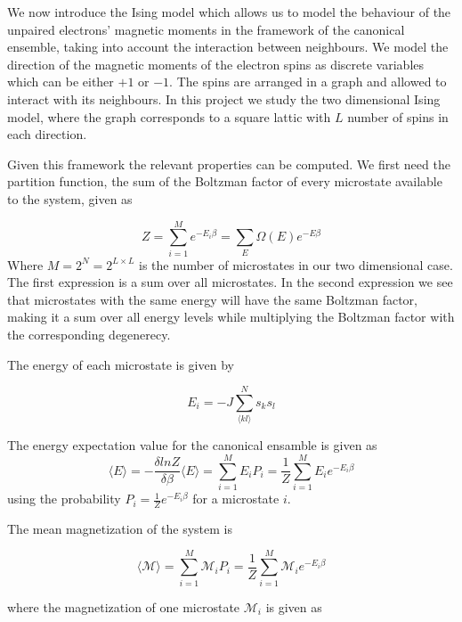 \documentclass[norsk, 10pt, twocolumn, a4paper]{revtex4}
\begin{document}
We now introduce the Ising model which allows us to model the behaviour of the unpaired electrons'
magnetic moments in the framework of the canonical
ensemble, taking into account the interaction between neighbours.
We model the direction of the
magnetic moments of the electron spins as discrete variables which can be either $+1$ or
$-1$. The spins are arranged in a graph and allowed to interact with its neighbours.
In this project we study the two dimensional Ising model, where the graph corresponds to a
square lattic with $L$ number of spins in each direction.

Given this framework the relevant properties can be computed. We first need the partition function, the sum
of the Boltzman factor of every microstate available to the system, given as

\begin{equation}
    \label{eq:Z}
    Z = \sum\limits_{i=1}^M e^{-E_i\beta} = \sum\limits_E \Omega(E) e^{-E\beta}
\end{equation}
Where $M=2^N = 2^{L\times L}$ is the number of microstates in our two dimensional case. The first expression is a
sum over all microstates. In the second expression we see that microstates with the same
energy will have the same Boltzman factor, making it a sum over all energy levels while multiplying
the Boltzman factor with the corresponding degenerecy.

The energy of each microstate is given by

\begin{equation}
    \label{eq:Ei}
    E_i = -J\sum_{\langle kl \rangle}^N s_k s_l
\end{equation}


The energy expectation value for the canonical ensamble is given as
\begin{equation}
    \label{eq:Eexp}
    \langle E\rangle = -\frac{\delta ln Z}{\delta\beta}
    \langle E\rangle = \sum_{i=1}^M E_i P_i =\frac{1}{Z}\sum_{i=1}^M E_i e^{-E_i\beta}
\end{equation}
using the probability $P_i=\frac{1}{Z} e^{-E_i\beta}$ for a microstate $i$.

The mean magnetization of the system is

\begin{equation}
    \label{eq:Mexp}
    \langle \mathscr{M} \rangle =\sum_{i=1}^M \mathscr{M}_i P_i =\frac{1}{Z}\sum_{i=1}^M \mathscr{M}_i e^{-E_i\beta}
\end{equation}

where the magnetization of one microstate $\mathscr{M}_i$ is given as
\end{document}
